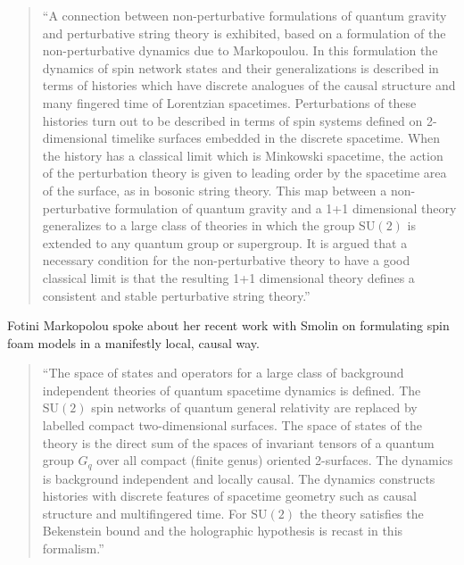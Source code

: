 \documentclass{article}
\def\tightlist{}
\renewcommand{\texttt}[1]{%
  \begingroup
  \ttfamily
  \begingroup\lccode`~=`/\lowercase{\endgroup\def~}{/\discretionary{}{}{}}%
  \begingroup\lccode`~=`[\lowercase{\endgroup\def~}{[\discretionary{}{}{}}%
  \begingroup\lccode`~=`.\lowercase{\endgroup\def~}{.\discretionary{}{}{}}%
  \catcode`/=\active\catcode`[=\active\catcode`.=\active
  \scantokens{#1\noexpand}%
  \endgroup
}
\begin{document}
\begin{quote}
``A connection between non-perturbative formulations of quantum gravity
and perturbative string theory is exhibited, based on a formulation of
the non-perturbative dynamics due to Markopoulou. In this formulation
the dynamics of spin network states and their generalizations is
described in terms of histories which have discrete analogues of the
causal structure and many fingered time of Lorentzian spacetimes.
Perturbations of these histories turn out to be described in terms of
spin systems defined on 2-dimensional timelike surfaces embedded in the
discrete spacetime. When the history has a classical limit which is
Minkowski spacetime, the action of the perturbation theory is given to
leading order by the spacetime area of the surface, as in bosonic string
theory. This map between a non-perturbative formulation of quantum
gravity and a 1+1 dimensional theory generalizes to a large class of
theories in which the group \(\mathrm{SU}(2)\) is extended to any
quantum group or supergroup. It is argued that a necessary condition for
the non-perturbative theory to have a good classical limit is that the
resulting 1+1 dimensional theory defines a consistent and stable
perturbative string theory.''
\end{quote}

Fotini Markopolou spoke about her recent work with Smolin on formulating
spin foam models in a manifestly local, causal way.


\begin{quote}
``The space of states and operators for a large class of background
independent theories of quantum spacetime dynamics is defined. The
\(\mathrm{SU}(2)\) spin networks of quantum general relativity are
replaced by labelled compact two-dimensional surfaces. The space of
states of the theory is the direct sum of the spaces of invariant
tensors of a quantum group \(G_q\) over all compact (finite genus)
oriented 2-surfaces. The dynamics is background independent and locally
causal. The dynamics constructs histories with discrete features of
spacetime geometry such as causal structure and multifingered time. For
\(\mathrm{SU}(2)\) the theory satisfies the Bekenstein bound and the
holographic hypothesis is recast in this formalism.''
\end{quote}
\end{document}
